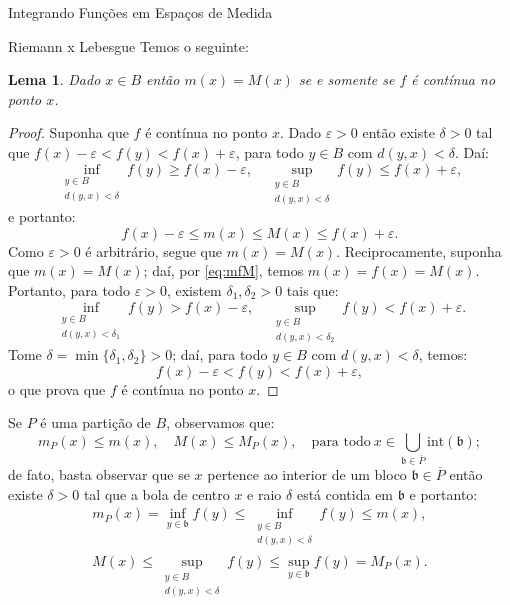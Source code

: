 \documentclass[oneside,final,11pt]{amsbook}
\newcommand{\Int}{\mathrm{int}}
\theoremstyle{remark}\newtheorem{exercise}{Exercício}[chapter]
\theoremstyle{remark}\newtheorem{*exercise}[exercise]{\hbox to 0pt{\hskip 0pt minus 1fil*}Exercício}
\theoremstyle{definition}\newtheorem{exdefin}{Definição}[chapter]
\theoremstyle{plain}\newtheorem{teo}{Teorema}[section]
\theoremstyle{plain}\newtheorem{lem}[teo]{Lema}
\theoremstyle{plain}\newtheorem{prop}[teo]{Proposição}
\theoremstyle{plain}\newtheorem{cor}[teo]{Corolário}
\theoremstyle{definition}\newtheorem{defin}[teo]{Definição}
\theoremstyle{remark}\newtheorem{rem}[teo]{Observação}
\theoremstyle{definition}\newtheorem{notation}[teo]{Notação}
\theoremstyle{definition}\newtheorem{convention}[teo]{Convenção}
\theoremstyle{definition}\newtheorem{example}[teo]{Exemplo}
\numberwithin{section}{chapter}
\numberwithin{equation}{section}
\begin{document}
\begin{chapter}{Integrando Funções em Espaços de Medida}
\begin{section}{Riemann x Lebesgue}
Temos o seguinte:
\begin{lem}\label{thm:migualMcontinua}
Dado $x\in B$ então $m(x)=M(x)$ se e somente se $f$ é contínua no ponto $x$.
\end{lem}
\begin{proof}
Suponha que $f$ é contínua no ponto $x$. Dado $\varepsilon>0$ então existe $\delta>0$
tal que $f(x)-\varepsilon<f(y)<f(x)+\varepsilon$, para todo $y\in B$
com $d(y,x)<\delta$. Daí:
\[\inf_{\substack{y\in B\\d(y,x)<\delta}}\!\!f(y)\ge f(x)-\varepsilon,\quad
\sup_{\substack{y\in B\\d(y,x)<\delta}}\!\!f(y)\le f(x)+\varepsilon,\]
e portanto:
\[f(x)-\varepsilon\le m(x)\le M(x)\le f(x)+\varepsilon.\]
Como $\varepsilon>0$ é arbitrário, segue que $m(x)=M(x)$. Reciprocamente, suponha que $m(x)=M(x)$;
daí, por \eqref{eq:mfM}, temos $m(x)=f(x)=M(x)$. Portanto, para todo $\varepsilon>0$, existem $\delta_1,\delta_2>0$
tais que:
\[\inf_{\substack{y\in B\\d(y,x)<\delta_1}}\!\!f(y)>f(x)-\varepsilon,\quad
\sup_{\substack{y\in B\\d(y,x)<\delta_2}}\!\!f(y)<f(x)+\varepsilon.\]
Tome $\delta=\min\{\delta_1,\delta_2\}>0$; daí, para todo $y\in B$ com $d(y,x)<\delta$,
temos:
\[f(x)-\varepsilon<f(y)<f(x)+\varepsilon,\]
o que prova que $f$ é contínua no ponto $x$.
\end{proof}

Se $P$ é uma partição de $B$, observamos que:
\begin{equation}\label{eq:mmPMMP}
m_P(x)\le m(x),\quad M(x)\le M_P(x),\quad
\text{para todo}\ x\in\bigcup_{\mathfrak b\in\overline P}\Int(\mathfrak b);
\end{equation}
de fato, basta observar que se $x$ pertence ao interior de um bloco $\mathfrak b\in\overline P$
então existe $\delta>0$ tal que a bola de centro $x$ e raio $\delta$ está contida em $\mathfrak b$
e portanto:
\begin{gather*}
m_P(x)=\inf_{y\in\mathfrak b}f(y)\le\!\!\!\inf_{\substack{y\in B\\d(y,x)<\delta}}\!\!f(y)\le m(x),\\
M(x)\le\!\!\!\sup_{\substack{y\in B\\d(y,x)<\delta}}\!\!f(y)\le\sup_{y\in\mathfrak b}f(y)=M_P(x).
\end{gather*}


\end{section}
\end{chapter}
\end{document}
